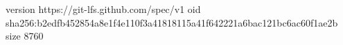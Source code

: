 version https://git-lfs.github.com/spec/v1
oid sha256:b2edfb452854a8e1f4e110f3a41818115a41f642221a6bac121bc6ac60f1ae2b
size 8760

